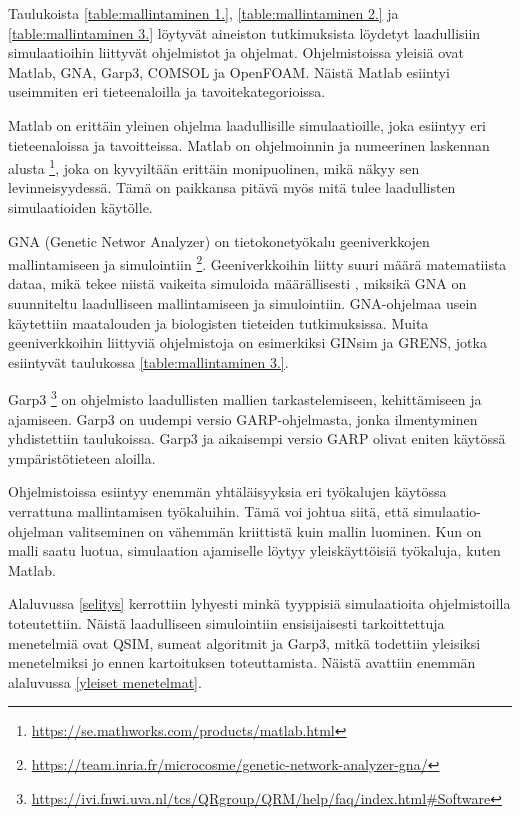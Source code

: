 \documentclass[utf8]{gradu3}
\begin{document}
Taulukoista \ref{table:mallintaminen 1.}, \ref{table:mallintaminen 2.} ja 
\ref{table:mallintaminen 3.} löytyvät aineiston tutkimuksista löydetyt 
laadullisiin simulaatioihin liittyvät ohjelmistot ja ohjelmat.
Ohjelmistoissa yleisiä ovat Matlab, GNA, Garp3, COMSOL ja OpenFOAM. 
Näistä Matlab esiintyi useimmiten eri tieteenaloilla ja tavoitekategorioissa.

Matlab on erittäin yleinen ohjelma laadullisille simulaatioille, joka esiintyy eri 
tieteenaloissa ja tavoitteissa. Matlab on ohjelmoinnin ja numeerinen laskennan alusta
\footnote{\url{https://se.mathworks.com/products/matlab.html}},
joka on kyvyiltään erittäin monipuolinen, mikä näkyy sen levinneisyydessä. 
Tämä on paikkansa pitävä myös mitä tulee laadullisten simulaatioiden käytölle.

GNA (Genetic Networ Analyzer) on tietokonetyökalu geeniverkkojen mallintamiseen 
ja simulointiin 
\footnote{\url{https://team.inria.fr/microcosme/genetic-network-analyzer-gna/}}. 
Geeniverkkoihin liitty suuri määrä matematiista dataa, mikä tekee niistä vaikeita 
simuloida määrällisesti \parencite{gnaGeneticNetworkAnalyzer2003}, miksikä
GNA on suunniteltu laadulliseen mallintamiseen ja simulointiin. GNA-ohjelmaa 
usein käytettiin maatalouden ja biologisten tieteiden tutkimuksissa.
Muita geeniverkkoihin liittyviä ohjelmistoja on esimerkiksi GINsim ja GRENS,
jotka esiintyvät taulukossa \ref{table:mallintaminen 3.}.

Garp3 
\footnote{\url{https://ivi.fnwi.uva.nl/tcs/QRgroup/QRM/help/faq/index.html\#Software}} 
on ohjelmisto laadullisten mallien tarkastelemiseen, kehittämiseen ja 
ajamiseen. Garp3 on uudempi versio GARP-ohjelmasta, jonka ilmentyminen
yhdistettiin taulukoissa.
Garp3 ja aikaisempi versio GARP olivat eniten käytössä
ympäristötieteen aloilla.

Ohjelmistoissa esiintyy enemmän yhtäläisyyksia eri työkalujen käytössa verrattuna
mallintamisen työkaluihin. Tämä voi johtua siitä, että simulaatio-ohjelman
valitseminen on vähemmän kriittistä kuin mallin luominen. 
Kun on malli saatu luotua, simulaation ajamiselle löytyy yleiskäyttöisiä 
työkaluja, kuten Matlab.

Alaluvussa \ref{selitys} kerrottiin lyhyesti minkä tyyppisiä 
simulaatioita ohjelmistoilla 
toteutettiin. Näistä laadulliseen simulointiin ensisijaisesti tarkoittettuja
menetelmiä ovat QSIM, sumeat algoritmit ja Garp3, mitkä todettiin yleisiksi
menetelmiksi jo ennen kartoituksen toteuttamista. Näistä avattiin enemmän 
alaluvussa \ref{yleiset menetelmat}.
\end{document}
